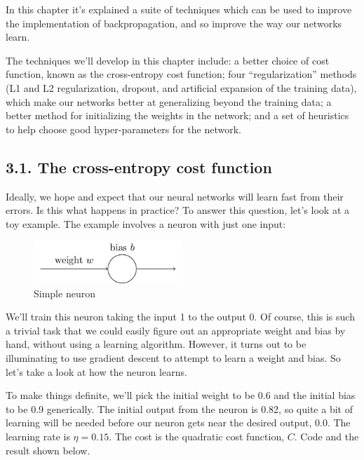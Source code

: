 \documentclass[12 pt]{article}
\begin{document}
In this chapter it's explained a suite of techniques which can be used
to improve the implementation of backpropagation, and so improve the way
our networks learn.

The techniques we'll develop in this chapter include: a better choice of
cost function, known as the cross-entropy cost function; four
``regularization'' methods (L1 and L2 regularization, dropout, and
artificial expansion of the training data), which make our networks
better at generalizing beyond the training data; a better method for
initializing the weights in the network; and a set of heuristics to help
choose good hyper-parameters for the network.

\subsection{3.1. The cross-entropy cost function}
\label{the-cross-entropy-cost-function}

Ideally, we hope and expect that our neural networks will learn fast
from their errors. Is this what happens in practice? To answer this
question, let's look at a toy example. The example involves a neuron
with just one input:

\begin{figure}[htbp]
\centering
\includegraphics[width=0.5\textwidth]{./figs/tikz28.png}
\caption{Simple neuron}
\end{figure}

We'll train this neuron taking the input 1 to the output 0. Of course,
this is such a trivial task that we could easily figure out an
appropriate weight and bias by hand, without using a learning algorithm.
However, it turns out to be illuminating to use gradient descent to
attempt to learn a weight and bias. So let's take a look at how the
neuron learns.

To make things definite, we'll pick the initial weight to be 0.6 and the
initial bias to be 0.9 generically. The initial output from the neuron
is 0.82, so quite a bit of learning will be needed before our neuron
gets near the desired output, 0.0. The learning rate is $ \eta = 0.15. $
The cost is the quadratic cost function, $ C $. Code and the result
shown below.
\end{document}
